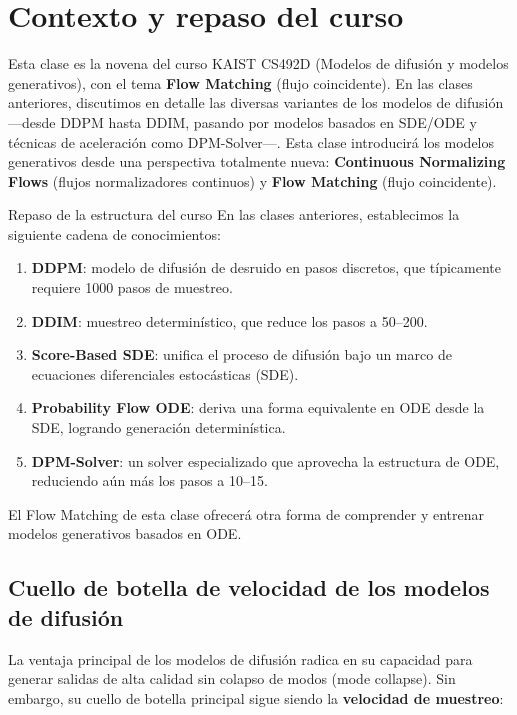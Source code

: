 \section{Contexto y repaso del curso}

Esta clase es la novena del curso KAIST CS492D (Modelos de difusión y modelos generativos), con el tema \textbf{Flow Matching} (flujo coincidente). En las clases anteriores, discutimos en detalle las diversas variantes de los modelos de difusión —desde DDPM hasta DDIM, pasando por modelos basados en SDE/ODE y técnicas de aceleración como DPM-Solver—. Esta clase introducirá los modelos generativos desde una perspectiva totalmente nueva: \textbf{Continuous Normalizing Flows} (flujos normalizadores continuos) y \textbf{Flow Matching} (flujo coincidente).

\begin{knowledgebox}{Repaso de la estructura del curso}
En las clases anteriores, establecimos la siguiente cadena de conocimientos:
\begin{enumerate}
    \item \textbf{DDPM}: modelo de difusión de desruido en pasos discretos, que típicamente requiere 1000 pasos de muestreo.
    \item \textbf{DDIM}: muestreo determinístico, que reduce los pasos a 50--200.
    \item \textbf{Score-Based SDE}: unifica el proceso de difusión bajo un marco de ecuaciones diferenciales estocásticas (SDE).
    \item \textbf{Probability Flow ODE}: deriva una forma equivalente en ODE desde la SDE, logrando generación determinística.
    \item \textbf{DPM-Solver}: un solver especializado que aprovecha la estructura de ODE, reduciendo aún más los pasos a 10--15.
\end{enumerate}
El Flow Matching de esta clase ofrecerá otra forma de comprender y entrenar modelos generativos basados en ODE.
\end{knowledgebox}

\subsection{Cuello de botella de velocidad de los modelos de difusión}

La ventaja principal de los modelos de difusión radica en su capacidad para generar salidas de alta calidad sin colapso de modos (mode collapse). Sin embargo, su cuello de botella principal sigue siendo la \textbf{velocidad de muestreo}:

